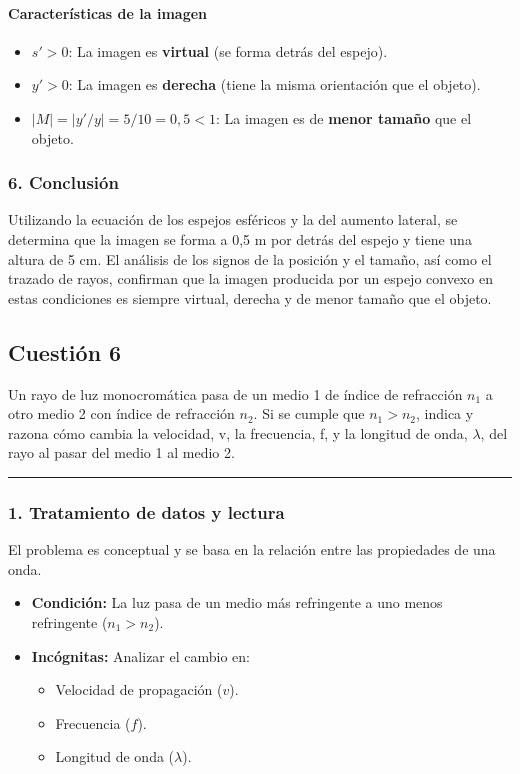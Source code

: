 \paragraph*{Características de la imagen}
\begin{itemize}
    \item $s' > 0$: La imagen es \textbf{virtual} (se forma detrás del espejo).
    \item $y' > 0$: La imagen es \textbf{derecha} (tiene la misma orientación que el objeto).
    \item $|M| = |y'/y| = 5/10 = 0,5 < 1$: La imagen es de \textbf{menor tamaño} que el objeto.
\end{itemize}

\subsubsection*{6. Conclusión}
\begin{cajaconclusion}
    Utilizando la ecuación de los espejos esféricos y la del aumento lateral, se determina que la imagen se forma a 0,5 m por detrás del espejo y tiene una altura de 5 cm. El análisis de los signos de la posición y el tamaño, así como el trazado de rayos, confirman que la imagen producida por un espejo convexo en estas condiciones es siempre virtual, derecha y de menor tamaño que el objeto.
\end{cajaconclusion}
\newpage

\subsection{Cuestión 6}
\label{subsec:C6_2024_jul_ext}

\begin{cajaenunciado}
Un rayo de luz monocromática pasa de un medio 1 de índice de refracción $n_1$ a otro medio 2 con índice de refracción $n_2$. Si se cumple que $n_1 > n_2$, indica y razona cómo cambia la velocidad, v, la frecuencia, f, y la longitud de onda, $\lambda$, del rayo al pasar del medio 1 al medio 2.
\end{cajaenunciado}
\hrule

\subsubsection*{1. Tratamiento de datos y lectura}
El problema es conceptual y se basa en la relación entre las propiedades de una onda.
\begin{itemize}
    \item \textbf{Condición:} La luz pasa de un medio más refringente a uno menos refringente ($n_1 > n_2$).
    \item \textbf{Incógnitas:} Analizar el cambio en:
    \begin{itemize}
        \item Velocidad de propagación ($v$).
        \item Frecuencia ($f$).
        \item Longitud de onda ($\lambda$).
    \end{itemize}
\end{itemize}

